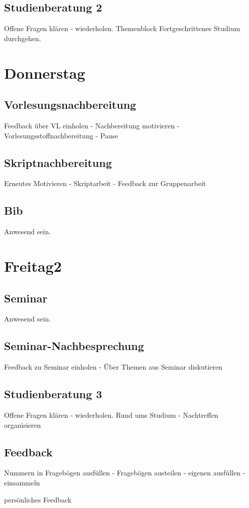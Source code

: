 \documentclass[10pt,a4paper,oneside,ngerman,numbers=noenddot]{scrartcl}
\begin{document}
	\subsection{Studienberatung 2}
		Offene Fragen klären - wiederholen. Themenblock Fortgeschrittenes Studium durchgehen.
	
\section{Donnerstag}
	\subsection{Vorlesungsnachbereitung}
		Feedback über VL einholen - Nachbereitung motivieren - Vorlesungsstoffnachbereitung - Pause
	\subsection{Skriptnachbereitung}
		Erneutes Motivieren - Skriptarbeit - Feedback zur Gruppenarbeit
	\subsection{Bib}
		Anwesend sein.

\section{Freitag2}
	\subsection{Seminar}
		Anwesend sein.
	\subsection{Seminar-Nachbesprechung}
		Feedback zu Seminar einholen - Über Themen aus Seminar diskutieren
	\subsection{Studienberatung 3}
		Offene Fragen klären - wiederholen. Rund ums Studium - Nachtreffen organisieren
	\subsection{Feedback}
		Nummern in Fragebögen ausfüllen - Fragebögen austeilen - eigenen ausfüllen - einsammeln

		persönliches Feedback
\end{document}
